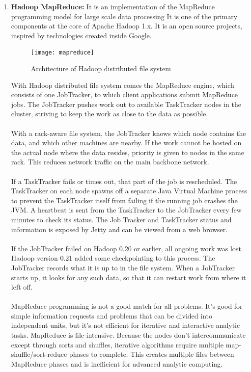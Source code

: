 \documentclass[a4paper,12pt,oneside]{report}
\begin{document}
\begin{enumerate}
        \item \textbf{Hadoop MapReduce:}
                It is an implementation of the MapReduce programming model for large scale data processing
                It is one of the primary components at the core of Apache Hadoop 1.x. It is an open source projects, inspired by technologies created inside Google.
                \begin{figure}[h!]
                        \centering
                        \texttt{[image: mapreduce]}
                        \caption{Architecture of Hadoop distributed file system}
                \end{figure}
                With Hadoop distributed file system comes the MapReduce engine, which consists of one JobTracker, to which client applications submit MapReduce jobs.
                The JobTracker pushes work out to available TaskTracker nodes in the cluster, striving to keep the work as close to the data as possible.\\
                \\
                With a rack-aware file system, the JobTracker knows which node contains the data, and which other machines are nearby. If the work cannot be hosted on the actual node where the data resides, priority is given to nodes in the same rack. This reduces network traffic on the main backbone network.\\
                \\
                If a TaskTracker fails or times out, that part of the job is rescheduled. The TaskTracker on each node spawns off a separate Java Virtual Machine process to prevent the TaskTracker itself from failing if the running job crashes the JVM. A heartbeat is sent from the TaskTracker to the JobTracker every few minutes to check its status. The Job Tracker and TaskTracker status and information is exposed by Jetty and can be viewed from a web browser.\\
                \\
                If the JobTracker failed on Hadoop 0.20 or earlier, all ongoing work was lost. Hadoop version 0.21 added some checkpointing to this process. The JobTracker records what it is up to in the file system. When a JobTracker starts up, it looks for any such data, so that it can restart work from where it left off.\\
                \\
                MapReduce programming is not a good match for all problems. It’s good for simple information requests and problems that can be divided into independent units, but it's not efficient for iterative and interactive analytic tasks. MapReduce is file-intensive. Because the nodes don’t intercommunicate except through sorts and shuffles, iterative algorithms require multiple map-shuffle/sort-reduce phases to complete. This creates multiple files between MapReduce phases and is inefficient for advanced analytic computing.\\


\end{enumerate}
\end{document}
